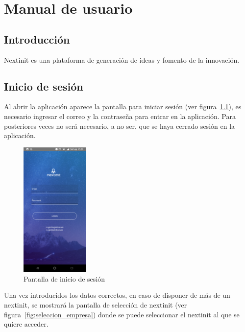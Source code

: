 \chapter{Manual de usuario}

\section{Introducción}

Nextinit es una plataforma de generación de ideas y fomento de la innovación. 

\section{Inicio de sesión}

Al abrir la aplicación aparece la pantalla para iniciar sesión (ver figura~\ref{fig:login}), es 
necesario ingresar el correo y la contraseña para entrar en la aplicación. Para posteriores 
veces no será necesario, a no ser, que se haya cerrado sesión en la aplicación.

\begin{figure}[!h]
	\begin{center}
		\includegraphics[width=0.3\textwidth]{./img/anexo1/login.png}
		\caption{Pantalla de inicio de sesión}
		\label{fig:login}
	\end{center}
\end{figure}

Una vez introducidos los datos correctos, en caso de disponer de más de un nextinit,
se mostrará la pantalla de selección de nextinit (ver figura~\ref{fig:seleccion_empresa}) 
donde se puede seleccionar el nextinit al que se quiere acceder.

